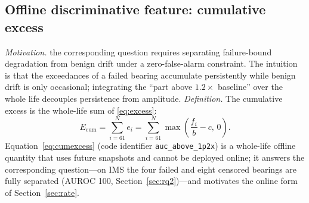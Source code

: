 \documentclass[journal]{IEEEtran}
\begin{document}
\subsection{Offline discriminative feature: cumulative excess}\label{sec:cumexcess}
\emph{Motivation.} the corresponding question requires separating failure-bound degradation from benign drift under a zero-false-alarm constraint. The intuition is that the exceedances of a failed bearing accumulate persistently while benign drift is only occasional; integrating the ``part above $1.2\times$ baseline'' over the whole life decouples persistence from amplitude. \emph{Definition.} The cumulative excess is the whole-life sum of \eqref{eq:excess}:
\begin{equation}
E_{\mathrm{cum}}=\sum_{i=61}^{N}e_i=\sum_{i=61}^{N}\max\left(\frac{f_i}{b}-c,\,0\right).
\label{eq:cumexcess}
\end{equation}
Equation~\eqref{eq:cumexcess} (code identifier \texttt{auc\_above\_1p2x}) is a whole-life offline quantity that uses future snapshots and cannot be deployed online; it answers the corresponding question---on IMS the four failed and eight censored bearings are fully separated (AUROC 100, Section~\ref{sec:rq2})---and motivates the online form of Section~\ref{sec:rate}.
\end{document}

